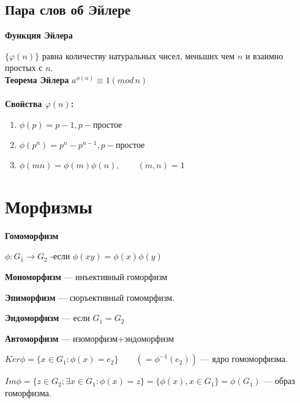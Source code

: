 \documentclass[12pt]{article}
\begin{document}
		\subsection{Пара слов об Эйлере}

		\hypertarget{el}{\textbf{Функция Эйлера}}$\bigl\{\varphi (n) \bigr\} $ равна количеству натуральных чисел, меньших чем $n$ и взаимно простых с $n$.\\

			\textbf{Теорема Эйлера} $a^{\phi(n)} \equiv 1(mod \, n) $\\\\
			
			\textbf{Свойства $\varphi(n)$:} 
			\begin{enumerate}
				\item	$\phi(p)=p-1, p-\text{простое}$
				\item	$\phi(p^n)=p^n-p^{n-1}, p-\text{простое}$
				\item	$\phi(mn)=\phi(m)\phi(n), \qquad (m,n)=1$	
			\end{enumerate}


		\newpage
		\section{Морфизмы}

			\hypertarget{indef:morfizm}{\textbf{Гомоморфизм}} $\phi:G_1 \rightarrow G_2$ -если $\phi(xy)=\phi(x)\phi(y)$
			
			\textbf{Мономорфизм} — инъективный гоморфизм
			
			\textbf{Эпиморфизм} — сюръективный гомомрфизм.
			
			\textbf{Эндоморфизм} — если $G_1=G_2$
			
			\textbf{Автоморфизм} — изоморфизм+эндоморфизм
			
			$Ker\phi =\{x\in G_1 :\phi (x)=e_2\} \qquad (=\phi ^{-1}(e_2))$ — ядро гомоморфизма.
			
			$Im\phi =\{z\in G_2 ; \exists x\in G_1:\phi (x)=z\}=\{\phi (x), x\in G_1\}=\phi (G_1)$ — образ гоморфизма.
			
\end{document}
